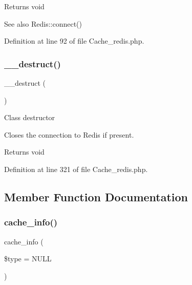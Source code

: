 \begin{DoxyReturn}{Returns}
void 
\end{DoxyReturn}
\begin{DoxySeeAlso}{See also}
Redis\+::connect() 
\end{DoxySeeAlso}


Definition at line 92 of file Cache\+\_\+redis.\+php.

\mbox{\label{class_c_i___cache__redis_a421831a265621325e1fdd19aace0c758}} 
\subsubsection{\texorpdfstring{\_\_destruct()}{\_\_destruct()}}
{\footnotesize\ttfamily \+\_\+\+\_\+destruct (\begin{DoxyParamCaption}{ }\end{DoxyParamCaption})}

Class destructor

Closes the connection to Redis if present.

\begin{DoxyReturn}{Returns}
void 
\end{DoxyReturn}


Definition at line 321 of file Cache\+\_\+redis.\+php.



\subsection{Member Function Documentation}
\mbox{\label{class_c_i___cache__redis_aa8b9c4d9f0387156736ccd8850f0727e}} 
\subsubsection{\texorpdfstring{cache\_info()}{cache\_info()}}
{\footnotesize\ttfamily cache\+\_\+info (\begin{DoxyParamCaption}\item[{}]{\$type = {\ttfamily NULL} }\end{DoxyParamCaption})}


